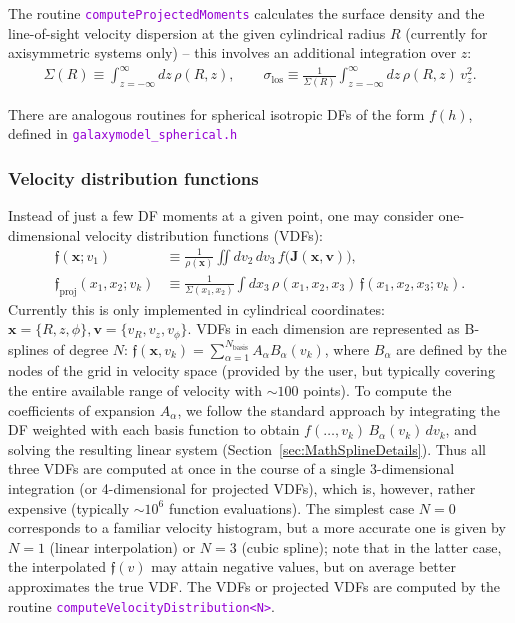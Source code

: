 \documentclass[12pt]{article}
\newcommand{\ttt}[1]{\textcolor{darkviolet}{\texttt{#1}}}
\newcommand{\bv}{\boldsymbol{v}}
\newcommand{\bx}{\boldsymbol{x}}
\newcommand{\bJ}{\boldsymbol{J}}
\begin{document}
The routine \ttt{computeProjectedMoments} calculates the surface density and the line-of-sight velocity dispersion at the given cylindrical radius $R$ (currently for axisymmetric systems only) -- this involves an additional integration over $z$:
\begin{align*}
\Sigma(R) \equiv \int_{z=-\infty}^\infty dz\, \rho(R,z), \qquad
\sigma_\mathrm{los} \equiv \frac{1}{\Sigma(R)} \int_{z=-\infty}^\infty dz\, \rho(R,z)\, v_z^2 .
\end{align*}

There are analogous routines for spherical isotropic DFs of the form $f(h)$, defined in \ttt{galaxymodel_spherical.h}

\subsubsection{Velocity distribution functions}  \label{sec:VDF}

Instead of just a few DF moments at a given point, one may consider one-dimensional velocity distribution functions (VDFs):
\begin{align*}
\mathfrak{f}(\bx;v_1) &\equiv \frac{1}{\rho(\bx)} \iint dv_2\,dv_3\, f\big(\bJ(\bx,\bv)\big) ,\\
\mathfrak{f}_\mathrm{proj}(x_1,x_2;v_k) &\equiv \frac{1}{\Sigma(x_1,x_2)} \int dx_3\, \rho(x_1,x_2,x_3)\,\mathfrak{f}(x_1,x_2,x_3;v_k) .
\end{align*}
Currently this is only implemented in cylindrical coordinates: $\bx=\{R,z,\phi\}, \bv=\{v_R,v_z,v_\phi\}$.
VDFs in each dimension are represented as B-splines of degree $N$: $\mathfrak{f}(\bx, v_k) = \sum_{\alpha=1}^{N_\mathrm{basis}} A_\alpha B_\alpha(v_k)$, where $B_\alpha$ are defined by the nodes of the grid in velocity space (provided by the user, but typically covering the entire available range of velocity with $\sim 100$ points). To compute the coefficients of expansion $A_\alpha$, we follow the standard approach by integrating the DF weighted with each basis function to obtain $f(\dots,v_k)\,B_\alpha(v_k)\,dv_k$, and solving the resulting linear system (Section~\ref{sec:MathSplineDetails}). Thus all three VDFs are computed at once in the course of a single 3-dimensional integration (or 4-dimensional for projected VDFs), which is, however, rather expensive (typically $\sim 10^6$ function evaluations). The simplest case $N=0$ corresponds to a familiar velocity histogram, but a more accurate one is given by $N=1$ (linear interpolation) or $N=3$ (cubic spline); note that in the latter case, the interpolated $\mathfrak{f}(v)$ may attain negative values, but on average better approximates the true VDF.
The VDFs or projected VDFs are computed by the routine \ttt{computeVelocityDistribution<N>}.
\end{document}
